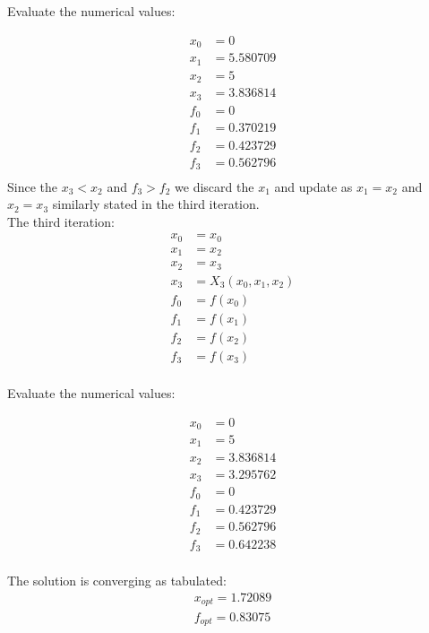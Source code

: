 \documentclass[12pt, a4paper]{article}
\numberwithin{equation}{section}
\begin{document}
Evaluate the numerical values:

\begin{equation}
\begin{align}
x_0 &= 0 \\
x_1 &= 5.580709 \\
x_2 &= 5  \\
x_3 &= 3.836814\\
f_0 &= 0 \\
f_1 &= 0.370219 \\
f_2 &= 0.423729 \\
f_3 &= 0.562796 \\
\end{align}
\end{equation}
Since the $x_3 < x_2$ and $f_3 > f_2$ we discard the $x_1$ and update as $x_1 = x_2$ and $x_2 = x_3$ similarly stated in the third iteration.\\
The third iteration:
\begin{equation}
\begin{align}
x_0 &= x_0 \\
x_1 &= x_2 \\
x_2 &= x_3  \\
x_3 &= X_3(x_0,x_1,x_2)\\
f_0 &= f(x_0) \\
f_1 &= f(x_1) \\
f_2 &= f(x_2) \\
f_3 &= f(x_3) \\
\end{align}
\end{equation}

Evaluate the numerical values:

\begin{equation}
\begin{align}
x_0 &= 0 \\
x_1 &= 5 \\
x_2 &= 3.836814  \\
x_3 &= 3.295762\\
f_0 &= 0 \\
f_1 &= 0.423729 \\
f_2 &= 0.562796 \\
f_3 &= 0.642238 \\
\end{align}
\end{equation}

The solution is converging as tabulated:
\begin{equation}
    \begin{align}
        x_{opt} = 1.72089\\
        f_{opt} = 0.83075
    \end{align}
\end{equation}
\end{document}
